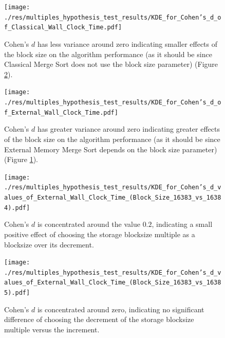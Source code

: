 \documentclass[twocolumn]{article}
\begin{document}
\begin{figure}[htb]
    \begin{minipage}{0.475 \textwidth}
        \centering
        \texttt{[image: ./res/multiples\_hypothesis\_test\_results/KDE\_for\_Cohen's\_d\_of\_Classical\_Wall\_Clock\_Time.pdf]}
        \caption{Cohen's \(d\) has less variance around zero indicating smaller effects of the block size on the algorithm performance (as it should be since Classical Merge Sort does not use the block size parameter)
            (Figure \ref{fig:KDE_for_Cohen's_d_of_External_Wall_Clock_Time.pdf}).}
        \label{fig:KDE_for_Cohen's_d_of_Classical_Wall_Clock_Time.pdf}
    \end{minipage}
\end{figure}

\begin{figure}[htb]
    \begin{minipage}{0.475 \textwidth}
        \centering
        \texttt{[image: ./res/multiples\_hypothesis\_test\_results/KDE\_for\_Cohen's\_d\_of\_External\_Wall\_Clock\_Time.pdf]}
        \caption{Cohen's \(d\) has greater variance around zero indicating greater effects of the block size on the algorithm performance (as it should be since
            External Memory Merge Sort depends on the block size parameter)
            (Figure \ref{fig:KDE_for_Cohen's_d_of_Classical_Wall_Clock_Time.pdf}).}
        \label{fig:KDE_for_Cohen's_d_of_External_Wall_Clock_Time.pdf}
    \end{minipage}
\end{figure}

\begin{figure}[htb]
    \begin{minipage}{0.475 \textwidth}
        \centering
        \texttt{[image: ./res/multiples\_hypothesis\_test\_results/KDE\_for\_Cohen's\_d\_values\_of\_External\_Wall\_Clock\_Time\_(Block\_Size\_16383\_vs\_16384).pdf]}
        \caption{Cohen's \(d\) is concentrated around the value \( 0.2 \), indicating a small positive effect of choosing the storage blocksize multiple as a blocksize over its decrement.}
        \label{fig:KDE_for_Cohen's_d_values_of_External_Wall_Clock_Time_(Block_Size_16383_vs_16384).pdf}
    \end{minipage}
\end{figure}

\begin{figure}[htb]
    \begin{minipage}{0.475 \textwidth}
        \centering
        \texttt{[image: ./res/multiples\_hypothesis\_test\_results/KDE\_for\_Cohen's\_d\_values\_of\_External\_Wall\_Clock\_Time\_(Block\_Size\_16383\_vs\_16385).pdf]}
        \caption{Cohen's \(d\) is concentrated around zero, indicating no significant difference of choosing the decrement of the storage blocksize multiple versus the increment.}
        \label{fig:KDE_for_Cohen's_d_values_of_External_Wall_Clock_Time_(Block_Size_16383_vs_16385).pdf}
    \end{minipage}
\end{figure}
\end{document}

